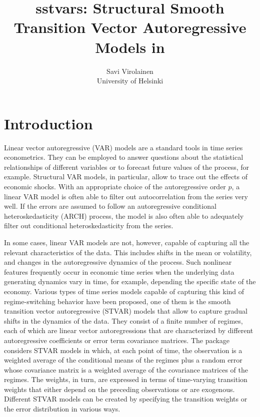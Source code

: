 \documentclass[nojss]{jss}
\author{Savi Virolainen\\ University of Helsinki}
\title{sstvars: Structural Smooth Transition Vector Autoregressive Models in \proglang{R}}
\makeatletter
\def\tableofcontents{%
  \section*{\contentsname}%
  \@starttoc{toc}%
}
\makeatother
\begin{document}
\pagebreak
\tableofcontents
\vfill
\pagebreak
{}

\section{Introduction}
Linear vector autoregressive (VAR) models are a standard tools in time series econometrics. They can be employed to answer questions about the statistical relationships of different variables or to forecast future values of the process, for example. Structural VAR models, in particular, allow to trace out the effects of economic shocks. With an appropriate choice of the autoregressive order $p$, a linear VAR model is often able to filter out autocorrelation from the series very well. If the errors are assumed to follow an autoregressive conditional heteroskedasticity (ARCH) process, the model is also often able to adequately filter out conditional heteroskedasticity from the series.

In some cases, linear VAR models are not, however, capable of capturing all the relevant characteristics of the data. This includes shifts in the mean or volatility, and changes in the autoregressive dynamics of the process. Such nonlinear features frequently occur in economic time series when the underlying data generating dynamics vary in time, for example, depending the specific state of the economy. Various types of time series models capable of capturing this kind of regime-switching behavior have been proposed, one of them is the smooth transition vector autoregressive (STVAR) models that allow to capture gradual shifts in the dynamics of the data. They consist of a finite number of regimes, each of which are linear vector autoregressions that are characterized by different autoregressive coefficients or error term covariance matrices. The package  considers STVAR models in which, at each point of time, the observation is a weighted average of the conditional means of the regimes plus a random error whose covariance matrix is a weighted average of the covariance matrices of the regimes. The weights, in turn, are expressed in terms of time-varying transition weights that either depend on the preceding observations or are exogenous. Different STVAR models can be created by specifying the transition weights or the error distribution in various ways.
\end{document}
